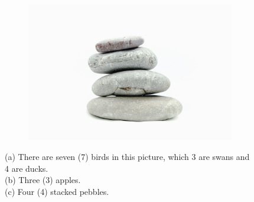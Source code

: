 \documentclass[../../mathematics_cheat_sheet.tex]{subfiles}
\begin{document}
\begin{figure}
\begin{subfigure}{0.5\textwidth}
         \includegraphics[width=\textwidth]{img/pebbles.jpeg}
         \caption{}
         \label{fig:pebbles}
     \end{subfigure}
     \caption[Correspondence between symbols and object quantities.]{(a) There are seven (7) birds in this picture, which 3 are swans and 4 are ducks. \\(b) Three (3) apples.\\ (c) Four (4) stacked pebbles.}\label{fig:exampleNumbers}
\end{figure}
\end{document}
